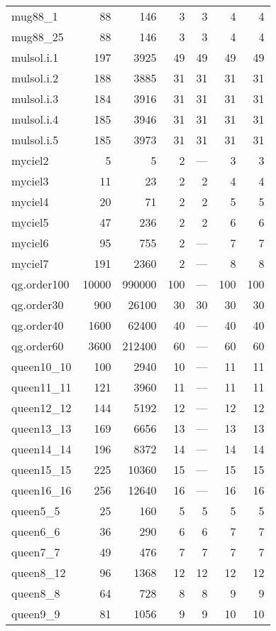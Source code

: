 \begin{longtable}{lrrrrrr}
  mug88\_1 & 88 & 146 & 3 & 3 & 4 & 4 \\ 
  mug88\_25 & 88 & 146 & 3 & 3 & 4 & 4 \\ 
  mulsol.i.1 & 197 & 3925 & 49 & 49 & 49 & 49 \\ 
  mulsol.i.2 & 188 & 3885 & 31 & 31 & 31 & 31 \\ 
  mulsol.i.3 & 184 & 3916 & 31 & 31 & 31 & 31 \\ 
  mulsol.i.4 & 185 & 3946 & 31 & 31 & 31 & 31 \\ 
  mulsol.i.5 & 185 & 3973 & 31 & 31 & 31 & 31 \\ 
  myciel2 & 5 & 5 & 2 & --- & 3 & 3 \\ 
  myciel3 & 11 & 23 & 2 & 2 & 4 & 4 \\ 
  myciel4 & 20 & 71 & 2 & 2 & 5 & 5 \\ 
  myciel5 & 47 & 236 & 2 & 2 & 6 & 6 \\ 
  myciel6 & 95 & 755 & 2 & --- & 7 & 7 \\ 
  myciel7 & 191 & 2360 & 2 & --- & 8 & 8 \\ 
  qg.order100 & 10000 & 990000 & 100 & --- & 100 & 100 \\ 
  qg.order30 & 900 & 26100 & 30 & 30 & 30 & 30 \\ 
  qg.order40 & 1600 & 62400 & 40 & --- & 40 & 40 \\ 
  qg.order60 & 3600 & 212400 & 60 & --- & 60 & 60 \\ 
  queen10\_10 & 100 & 2940 & 10 & --- & 11 & 11 \\ 
  queen11\_11 & 121 & 3960 & 11 & --- & 11 & 11 \\ 
  queen12\_12 & 144 & 5192 & 12 & --- & 12 & 12 \\ 
  queen13\_13 & 169 & 6656 & 13 & --- & 13 & 13 \\ 
  queen14\_14 & 196 & 8372 & 14 & --- & 14 & 14 \\ 
  queen15\_15 & 225 & 10360 & 15 & --- & 15 & 15 \\ 
  queen16\_16 & 256 & 12640 & 16 & --- & 16 & 16 \\ 
  queen5\_5 & 25 & 160 & 5 & 5 & 5 & 5 \\ 
  queen6\_6 & 36 & 290 & 6 & 6 & 7 & 7 \\ 
  queen7\_7 & 49 & 476 & 7 & 7 & 7 & 7 \\ 
  queen8\_12 & 96 & 1368 & 12 & 12 & 12 & 12 \\ 
  queen8\_8 & 64 & 728 & 8 & 8 & 9 & 9 \\ 
  queen9\_9 & 81 & 1056 & 9 & 9 & 10 & 10 \\ 

\end{longtable}
